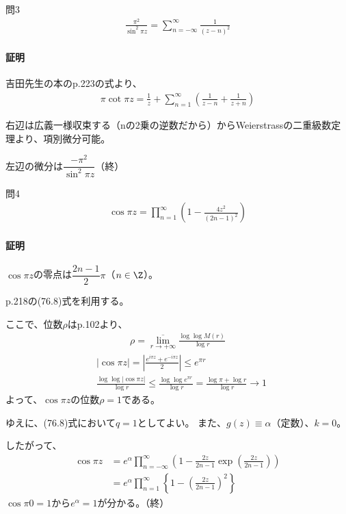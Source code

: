 \newpage
\begin{mysimplebox}{問3}
    \begin{align*}
        \frac{\pi^2}{\sin^2\pi z}=\sum_{n=-\infty}^{\infty}\frac{1}{(z-n)^2}
    \end{align*}
\end{mysimplebox}
\paragraph{証明}
吉田先生の本のp.223の式より、
\begin{align*}
    \pi\cot \pi z=\frac{1}{z}+\sum_{n=1}^{\infty}
    \left(\frac{1}{z-n}+\frac{1}{z+n}\right)
\end{align*}

右辺は広義一様収束する（nの2乗の逆数だから）からWeierstrassの二重級数定理より、項別微分可能。

左辺の微分は$\dfrac{-\pi^2}{\sin^2\pi z}$（終）


\newpage
\begin{mysimplebox}{問4}
    \begin{align*}
        \cos\pi z=\prod_{n=1}^{\infty}\left(1-\frac{4z^2}{(2n-1)^2}\right)
    \end{align*}
\end{mysimplebox}
\paragraph{証明}
$\cos\pi z$の零点は$\dfrac{2n-1}{2}\pi$（$n\in\Z$）。

p.218の(76.8)式を利用する。

ここで、位数$\rho$はp.102より、
\begin{align*}
    \rho=\overline{\lim_{r\to+\infty}}\frac{\log\log M(r)}{\log r}
\end{align*}
\begin{align*}
    &|\cos\pi z|=\left|\frac{e^{i\pi z}+e^{-i\pi z}}{2}\right|
    \le e^{\pi r}\\
    &\frac{\log\log|\cos\pi z|}{\log r}
    \le\frac{\log\log e^{\pi r}}{\log r}
    =\frac{\log \pi+\log r}{\log r}\longrightarrow1
\end{align*}
よって、$\cos\pi z$の位数$\rho=1$である。

ゆえに、(76.8)式において$q=1$としてよい。
また、$g(z)\equiv\alpha$（定数）、$k=0$。

したがって、
\begin{align*}
    \cos\pi z
    &=e^\alpha\prod_{n=-\infty}^{\infty}\left(1-\frac{2z}{2n-1}\exp\left(\frac{2z}{2n-1}\right)\right)\\
    &=e^\alpha\prod_{n=1}^{\infty}\left\{1-\left(\frac{2z}{2n-1}\right)^2\right\}
\end{align*}
$\cos\pi0=1$から$e^\alpha=1$が分かる。（終）

